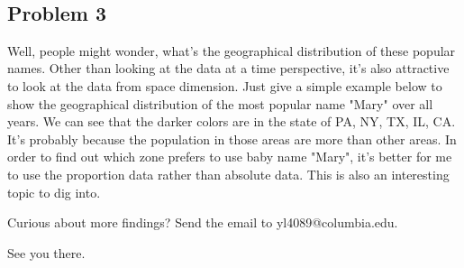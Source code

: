 \documentclass[11pt]{article}
\begin{document}
    \begin{center}
    \end{center}
    { \hspace*{\fill} \\}
    
    \subsection{Problem 3}\label{problem-3}

Well, people might wonder, what's the geographical distribution of these
popular names. Other than looking at the data at a time perspective,
it's also attractive to look at the data from space dimension. Just give
a simple example below to show the geographical distribution of the most
popular name "Mary" over all years. We can see that the darker colors
are in the state of PA, NY, TX, IL, CA. It's probably because the
population in those areas are more than other areas. In order to find
out which zone prefers to use baby name "Mary", it's better for me to
use the proportion data rather than absolute data. This is also an
interesting topic to dig into.

Curious about more findings? Send the email to yl4089@columbia.edu.

See you there.
\end{document}
